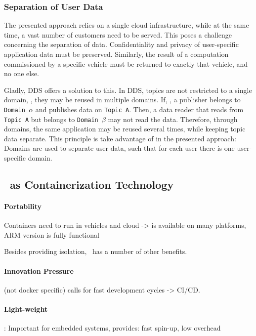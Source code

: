\subsubsection{Separation of User Data}
The presented approach relies on a single cloud infrastructure, while at the same time, a vast number of customers need to be served. This poses a challenge concerning the separation of data. Confidentiality and privacy of user-specific application data must be preserved. Similarly, the result of a computation commissioned by a specific vehicle must be returned to exactly that vehicle, and no one else. 

Gladly, DDS offers a solution to this. In DDS, topics are not restricted to a single domain, \ie , they may be reused in multiple domains. If, \eg , a publisher belongs to \texttt{Domain $\alpha$} and publishes data on \texttt{Topic A}. Then, a data reader that reads from \texttt{Topic A} but belongs to \texttt{Domain $\beta$} may not read the data. Therefore, through domains, the same application may be reused several times, while keeping topic data separate. This principle is take advantage of in the presented approach: Domains are used to separate user data, such that for each user there is one user-specific domain.




\subsection{\docker\ as Containerization Technology}

\paragraph{Portability} Containers need to run in vehicles and cloud -> \docker is available on many platforms, ARM version is fully functional

Besides providing isolation, \docker\ has a number of other benefits. 
\paragraph{Innovation Pressure}(not docker specific) calls for fast development cycles -> CI/CD.

\paragraph{Light-weight}: Important for embedded systems, provides: fast spin-up, low overhead


